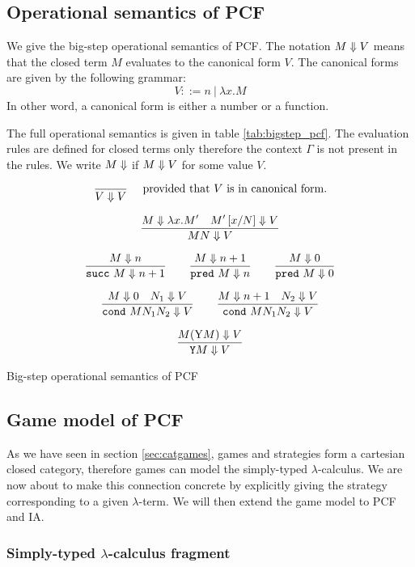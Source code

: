 \subsection{Operational semantics of PCF}

We give the big-step operational semantics of PCF. The notation $M \Downarrow V$ means
that the closed term $M$ evaluates to the canonical form $V$. The canonical forms are given by the following
grammar:
$$V ::= n\ |\ \lambda x. M$$
In other word, a canonical form is either a number or a function.

The full operational semantics is given in table
\ref{tab:bigstep_pcf}. The evaluation rules are defined for closed
terms only therefore the context $\Gamma$ is not present in the
rules. We write $M \Downarrow$ if $M \Downarrow V$ for some value $V$.

\begin{table}[htbp]
$$\frac{\displaystyle }{V \Downarrow V} \quad \mbox{ provided that $V$ is in canonical form.} $$

$$ \frac{\displaystyle M \Downarrow \lambda x. M' \quad M'\left[ x/N \right] \Downarrow V}{M N \Downarrow V}$$

$$\frac{\displaystyle M \Downarrow n}{\texttt{succ}\ M \Downarrow n+1}
\qquad \frac{\displaystyle M \Downarrow n+1}{\texttt{pred}\ M \Downarrow n}
\qquad \frac{\displaystyle M \Downarrow 0}{\texttt{pred}\ M \Downarrow 0}$$

$$\frac{\displaystyle M \Downarrow 0 \quad N_1 \Downarrow V}{\texttt{cond}\ M N_1 N_2  \Downarrow V}
\qquad
 \frac{\displaystyle M \Downarrow n+1 \quad N_2 \Downarrow V}{\texttt{cond}\ M N_1 N_2  \Downarrow V}$$

$$\frac{\displaystyle M (\mathrm{Y} M) \Downarrow V }{\texttt{Y} M \Downarrow V}$$
\label{tab:bigstep_pcf}
\caption{Big-step operational semantics of PCF}
\end{table}



\subsection{Game model of PCF}
\label{subsec:pcfgamemodel}

As we have seen in section \ref{sec:catgames}, games and strategies
form a cartesian closed category, therefore games can model the
simply-typed $\lambda$-calculus. We are now about to make this
connection concrete by explicitly giving the strategy corresponding
to a given $\lambda$-term. We will then extend the game model to PCF
and IA.

\subsubsection{Simply-typed $\lambda$-calculus fragment}

